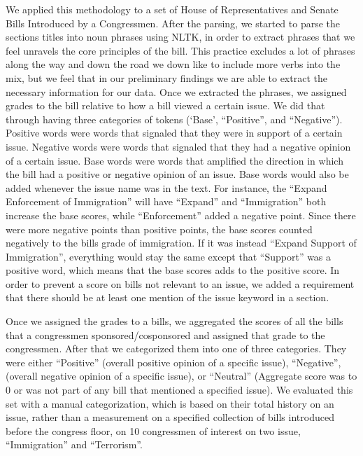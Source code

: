 \documentclass[12pt]{article}
\begin{document}
\par{We applied this methodology to a set of House of Representatives and Senate Bills Introduced by a Congressmen. After the parsing, we started to parse the sections titles into noun phrases using NLTK, in order to extract phrases that we feel unravels the core principles of the bill. This practice excludes a lot of phrases along the way and down the road we down like to include more verbs into the mix, but we feel that in our preliminary findings we are able to extract the necessary information for our data. Once we extracted the phrases, we assigned grades to the bill relative to how a bill viewed a certain issue. We did that through having three categories of tokens (‘Base’, “Positive”, and “Negative”). Positive words were words that signaled that they were in support of a certain issue. Negative words were words that signaled that they had a negative opinion of a certain issue. Base words were words that amplified the direction in which the bill had a positive or negative opinion of an issue. Base words would also be added whenever the issue name was in the text. For instance, the “Expand Enforcement of Immigration” will have “Expand” and “Immigration” both increase the base scores, while “Enforcement” added a negative point. Since there were more negative points than positive points, the base scores counted negatively to the bills grade of immigration. If it was instead “Expand Support of Immigration”, everything would stay the same except that “Support” was a positive word, which means that the base scores adds to the positive score. In order to prevent a score on bills not relevant to an issue, we added a requirement that there should be at least one mention of the issue keyword in a section.
}

\par{Once we assigned the grades to a bills, we aggregated the scores of all the bills that a congressmen sponsored/cosponsored and assigned that grade to the congressmen. After that we categorized them into one of three categories. They were either “Positive” (overall positive opinion of a specific issue), “Negative”, (overall negative opinion of a specific issue), or “Neutral” (Aggregate score was to 0 or was not part of any bill that mentioned a specified issue). We evaluated this set with a manual categorization, which is based on their total history on an issue, rather than a measurement on a specified collection of bills introduced before the congress floor, on 10 congressmen of interest on two issue, “Immigration” and “Terrorism”.}
\end{document}
